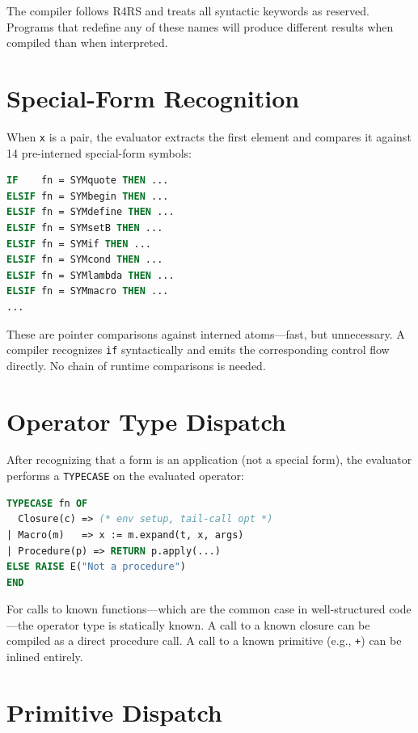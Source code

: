 \documentclass[12pt]{report}
\begin{document}
The compiler follows R4RS and treats all syntactic keywords as
reserved.  Programs that redefine any of these names will produce
different results when compiled than when interpreted.

\section{Special-Form Recognition}
\label{sec:sfrecog}

When \texttt{x} is a pair, the evaluator extracts the first element
and compares it against 14 pre-interned special-form symbols:

\begin{lstlisting}[language=Modula3]
IF    fn = SYMquote THEN ...
ELSIF fn = SYMbegin THEN ...
ELSIF fn = SYMdefine THEN ...
ELSIF fn = SYMsetB THEN ...
ELSIF fn = SYMif THEN ...
ELSIF fn = SYMcond THEN ...
ELSIF fn = SYMlambda THEN ...
ELSIF fn = SYMmacro THEN ...
...
\end{lstlisting}

These are pointer comparisons against interned atoms---fast, but
unnecessary.  A compiler recognizes \texttt{if} syntactically and
emits the corresponding control flow directly.  No chain of runtime
comparisons is needed.

\section{Operator Type Dispatch}
\label{sec:opdispatch}

After recognizing that a form is an application (not a special form),
the evaluator performs a \texttt{TYPECASE} on the evaluated operator:

\begin{lstlisting}[language=Modula3]
TYPECASE fn OF
  Closure(c) => (* env setup, tail-call opt *)
| Macro(m)   => x := m.expand(t, x, args)
| Procedure(p) => RETURN p.apply(...)
ELSE RAISE E("Not a procedure")
END
\end{lstlisting}

For calls to known functions---which are the common case in
well-structured code---the operator type is statically known.
A call to a known closure can be compiled as a direct procedure
call.  A call to a known primitive (e.g., \texttt{+}) can be
inlined entirely.

\section{Primitive Dispatch}
\label{sec:primdispatch}
\end{document}
